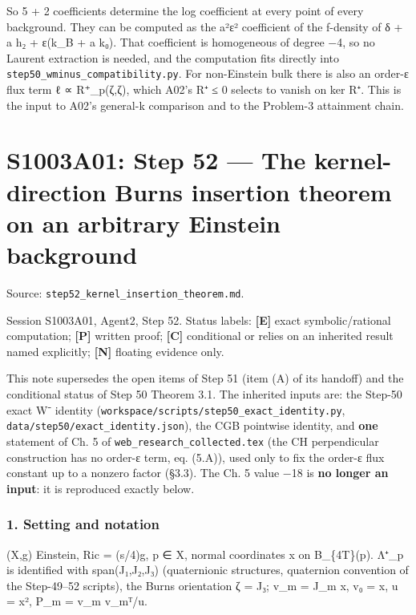 \documentclass[
  10pt,
]{report}
\begin{document}
So 5 + 2 coefficients determine the log coefficient at every point of
every background. They can be computed as the a²ε² coefficient of the
f-density of δ + a h₂ + ε(k\_B + a k₀). That coefficient is homogeneous
of degree −4, so no Laurent extraction is needed, and the computation
fits directly into \texttt{step50\_wminus\_compatibility.py}. For
non-Einstein bulk there is also an order-ε flux term ℓ ∝ R⁺\_p(ζ,ζ),
which A02's R⁺ ≤ 0 selects to vanish on ker R⁺. This is the input to
A02's general-k comparison and to the Problem-3 attainment chain.

\hypertarget{s1003a01-step-52-the-kernel-direction-burns-insertion-theorem-on-an-arbitrary-einstein-background}{%
\chapter{S1003A01: Step 52 --- The kernel-direction Burns insertion
theorem on an arbitrary Einstein
background}\label{s1003a01-step-52-the-kernel-direction-burns-insertion-theorem-on-an-arbitrary-einstein-background}}

Source: \texttt{step52\_kernel\_insertion\_theorem.md}.

Session S1003A01, Agent2, Step 52. Status labels: \textbf{{[}E{]}} exact
symbolic/rational computation; \textbf{{[}P{]}} written proof;
\textbf{{[}C{]}} conditional or relies on an inherited result named
explicitly; \textbf{{[}N{]}} floating evidence only.

This note supersedes the open items of Step 51 (item (A) of its handoff)
and the conditional status of Step 50 Theorem 3.1. The inherited inputs
are: the Step-50 exact W⁻ identity
(\texttt{workspace/scripts/step50\_exact\_identity.py},
\texttt{data/step50/exact\_identity.json}), the CGB pointwise identity,
and \textbf{one} statement of Ch. 5 of
\texttt{web\_research\_collected.tex} (the CH perpendicular construction
has no order-ε term, eq. (5.A)), used only to fix the order-ε flux
constant up to a nonzero factor (§3.3). The Ch. 5 value −18 is
\textbf{no longer an input}: it is reproduced exactly below.

\hypertarget{setting-and-notation-1}{%
\subsection{1. Setting and notation}\label{setting-and-notation-1}}

(X,g) Einstein, Ric = (s/4)g, p ∈ X, normal coordinates x on
B\_\{4T\}(p). Λ⁺\_p is identified with span(J₁,J₂,J₃) (quaternionic
structures, quaternion convention of the Step-49--52 scripts), the Burns
orientation ζ = J₃; v\_m = J\_m x, v₀ = x, u = \textbar x\textbar², P\_m
= v\_m v\_mᵀ/u.
\end{document}

